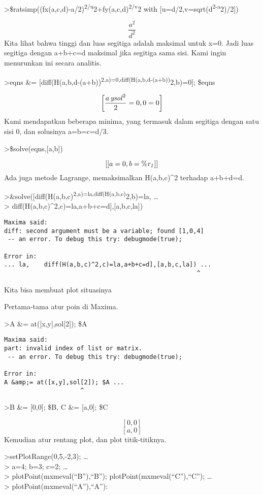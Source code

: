 \documentclass[
]{book}
\begin{document}
\textgreater\$ratsimp((fx(a,c,d)-a/2)\textsuperscript{2/u}2+fy(a,c,d)\textsuperscript{2/v}2 with {[}u=d/2,v=sqrt(d\textsuperscript{2-a}2)/2{]})

\[\frac{a^2}{d^2}\]Kita lihat bahwa tinggi dan luas segitiga adalah maksimal untuk x=0. Jadi luas segitiga dengan a+b+c=d maksimal jika segitiga sama sisi. Kami ingin menurunkan ini secara analitis.

\textgreater eqns \&= {[}diff(H(a,b,d-(a+b))\textsuperscript{2,a)=0,diff(H(a,b,d-(a+b))}2,b)=0{]}; \$eqns

\[\left[ \frac{a\,{\it ysol}^2}{2}=0 , 0=0 \right]\]Kami mendapatkan beberapa minima, yang termasuk dalam segitiga dengan satu sisi 0, dan solusinya a=b=c=d/3.

\textgreater\$solve(eqns,{[}a,b{]})

\[\left[ \left[ a=0 , b={\it \%r_1} \right]  \right]\]Ada juga metode Lagrange, memaksimalkan H(a,b,c)\^{}2 terhadap a+b+d=d.

\textgreater\&solve({[}diff(H(a,b,c)\textsuperscript{2,a)=la,diff(H(a,b,c)}2,b)=la, \ldots{}\\
\textgreater{} diff(H(a,b,c)\^{}2,c)=la,a+b+c=d{]},{[}a,b,c,la{]})

\begin{verbatim}
Maxima said:
diff: second argument must be a variable; found [1,0,4]
 -- an error. To debug this try: debugmode(true);

Error in:
... la,    diff(H(a,b,c)^2,c)=la,a+b+c=d],[a,b,c,la]) ...
                                                     ^
\end{verbatim}

Kita bisa membuat plot situasinya

Pertama-tama atur poin di Maxima.

\textgreater A \&= at({[}x,y{]},sol{[}2{]}); \$A

\begin{verbatim}
Maxima said:
part: invalid index of list or matrix.
 -- an error. To debug this try: debugmode(true);

Error in:
A &amp;= at([x,y],sol[2]); $A ...
                     ^
\end{verbatim}

\textgreater B \&= {[}0,0{]}; \$B, C \&= {[}a,0{]}; \$C

\[\left[ 0 , 0 \right] \]\[\left[ a , 0 \right] \]Kemudian atur rentang plot, dan plot titik-titiknya.

\textgreater setPlotRange(0,5,-2,3); \ldots{}\\
\textgreater{} a=4; b=3; c=2; \ldots{}\\
\textgreater{} plotPoint(mxmeval(``B''),``B''); plotPoint(mxmeval(``C''),``C''); \ldots{}\\
\textgreater{} plotPoint(mxmeval(``A''),``A''):
\end{document}
